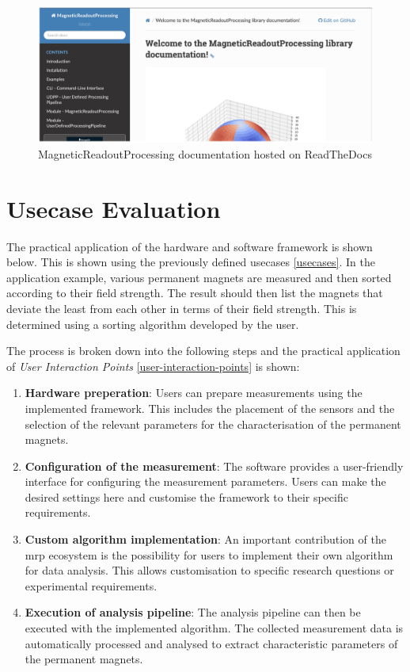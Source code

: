 \begin{figure}
\centering
\includegraphics{./generated_images/border_MagneticReadoutProcessing_documentation_hosted_on_ReadTheDocs.png}
\caption{MagneticReadoutProcessing documentation hosted on ReadTheDocs
\label{MagneticReadoutProcessing_documentation_hosted_on_ReadTheDocs.png}}
\end{figure}

\hypertarget{usecase-evaluation}{%
\chapter{Usecase Evaluation}\label{usecase-evaluation}}

The practical application of the hardware and software framework is
shown below. This is shown using the previously defined usecases
\ref{usecases}. In the application example, various permanent magnets
are measured and then sorted according to their field strength. The
result should then list the magnets that deviate the least from each
other in terms of their field strength. This is determined using a
sorting algorithm developed by the user.

The process is broken down into the following steps and the practical
application of \emph{User Interaction Points}
\ref{user-interaction-points} is shown:

\begin{enumerate}
\def\labelenumi{\arabic{enumi}.}
\item
  \textbf{Hardware preperation}: Users can prepare measurements using
  the implemented framework. This includes the placement of the sensors
  and the selection of the relevant parameters for the characterisation
  of the permanent magnets.
\item
  \textbf{Configuration of the measurement}: The software provides a
  user-friendly interface for configuring the measurement parameters.
  Users can make the desired settings here and customise the framework
  to their specific requirements.
\item
  \textbf{Custom algorithm implementation}: An important contribution of
  the \gls{mrp} ecosystem is the possibility for users to implement
  their own algorithm for data analysis. This allows customisation to
  specific research questions or experimental requirements.
\item
  \textbf{Execution of analysis pipeline}: The analysis pipeline can
  then be executed with the implemented algorithm. The collected
  measurement data is automatically processed and analysed to extract
  characteristic parameters of the permanent magnets.
\end{enumerate}

